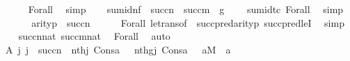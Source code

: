 \begin{isabellebody}
\ \ \ \ \isamarkupfalse%
\ Forall\ \isamarkupfalse%
\ simp\isanewline
\ \ \isamarkupfalse%
\ {}{\isacharcolon}{\kern0pt}{\isachardoublequoteopen}sum{\isacharunderscore}{\kern0pt}id{\isacharparenleft}{\kern0pt}n{\isacharcomma}{\kern0pt}f{\isacharparenright}{\kern0pt}\ {\isasymin}\ succ{\isacharparenleft}{\kern0pt}n{\isacharparenright}{\kern0pt}\ {\isasymrightarrow}\ succ{\isacharparenleft}{\kern0pt}m{\isacharparenright}{\kern0pt}{\isachardoublequoteclose}\ {\isacharparenleft}{\kern0pt}\ {\isachardoublequoteopen}{\isacharquery}{\kern0pt}g\ {\isasymin}\ {\isacharunderscore}{\kern0pt}{\isachardoublequoteclose}{\isacharparenright}{\kern0pt}\ \isamarkupfalse%
\ sum{\isacharunderscore}{\kern0pt}id{\isacharunderscore}{\kern0pt}tc\ Forall\ \isamarkupfalse%
\ simp\isanewline
\ \ \isamarkupfalse%
\ \isamarkupfalse%
\ {}{\isacharcolon}{\kern0pt}\ {\isachardoublequoteopen}arity{\isacharparenleft}{\kern0pt}p{\isacharparenright}{\kern0pt}\ {\isasymle}\ succ{\isacharparenleft}{\kern0pt}n{\isacharparenright}{\kern0pt}{\isachardoublequoteclose}\isanewline
\ \ \ \ \isamarkupfalse%
\ Forall\ le{\isacharunderscore}{\kern0pt}trans{\isacharbrackleft}{\kern0pt}of\ {\isacharunderscore}{\kern0pt}\ {\isachardoublequoteopen}succ{\isacharparenleft}{\kern0pt}pred{\isacharparenleft}{\kern0pt}arity{\isacharparenleft}{\kern0pt}p{\isacharparenright}{\kern0pt}{\isacharparenright}{\kern0pt}{\isacharparenright}{\kern0pt}{\isachardoublequoteclose}{\isacharbrackright}{\kern0pt}\ succpred{\isacharunderscore}{\kern0pt}leI\ \isamarkupfalse%
\ simp\isanewline
\ \ \isamarkupfalse%
\ {\isachardoublequoteopen}succ{\isacharparenleft}{\kern0pt}n{\isacharparenright}{\kern0pt}{\isasymin}nat{\isachardoublequoteclose}\ {\isachardoublequoteopen}succ{\isacharparenleft}{\kern0pt}m{\isacharparenright}{\kern0pt}{\isasymin}nat{\isachardoublequoteclose}\ \isamarkupfalse%
\ Forall\ \isamarkupfalse%
\ auto\isanewline
\ \ \isamarkupfalse%
\ \isamarkupfalse%
\ A{\isacharcolon}{\kern0pt}{\isachardoublequoteopen}{\isasymAnd}\ j\ {\isachardot}{\kern0pt}j\ {\isacharless}{\kern0pt}\ succ{\isacharparenleft}{\kern0pt}n{\isacharparenright}{\kern0pt}\ {\isasymLongrightarrow}\ nth{\isacharparenleft}{\kern0pt}j{\isacharcomma}{\kern0pt}\ Cons{\isacharparenleft}{\kern0pt}a{\isacharcomma}{\kern0pt}\ {\isasymrho}{\isacharparenright}{\kern0pt}{\isacharparenright}{\kern0pt}\ {\isacharequal}{\kern0pt}\ nth{\isacharparenleft}{\kern0pt}{\isacharquery}{\kern0pt}g{\isacharbackquote}{\kern0pt}j{\isacharcomma}{\kern0pt}\ Cons{\isacharparenleft}{\kern0pt}a{\isacharcomma}{\kern0pt}\ {\isasymrho}{\isacharprime}{\kern0pt}{\isacharparenright}{\kern0pt}{\isacharparenright}{\kern0pt}{\isachardoublequoteclose}\ \ {\isachardoublequoteopen}a{\isasymin}M{\isachardoublequoteclose}\ \ a\isanewline

\end{isabellebody}
